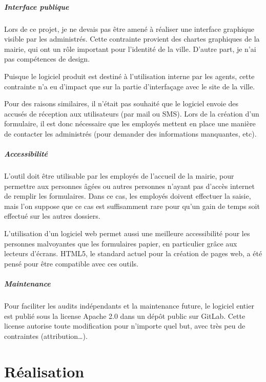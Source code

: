 \documentclass[11pt,french]{memoir}
\begin{document}
	\paragraph{Interface publique}
	Lors de ce projet, je ne devais pas être amené à réaliser une interface graphique visible par les administrés.
	Cette contrainte provient des chartes graphiques de la mairie, qui ont un rôle important pour l'identité de la ville.
	D'autre part, je n'ai pas compétences de design.

	Puisque le logiciel produit est destiné à l'utilisation interne par les agents, cette contrainte n'a eu d'impact que sur la partie d'interfaçage avec le site de la ville.

	Pour des raisons similaires, il n'était pas souhaité que le logiciel envoie des accusés de réception aux utilisateurs (par mail ou SMS).
	Lors de la création d'un formulaire, il est donc nécessaire que les employés mettent en place une manière de contacter les administrés (pour demander des informations manquantes, etc).

	\paragraph{Accessibilité}
	L'outil doit être utilisable par les employés de l'accueil de la mairie, pour permettre aux personnes âgées ou autres personnes n'ayant pas d'accès internet de remplir les formulaires.
	Dans ce cas, les employés doivent effectuer la saisie, mais l'on suppose que ce cas est suffisamment rare pour qu'un gain de temps soit effectué sur les autres dossiers.

	L'utilisation d'un logiciel web permet aussi une meilleure accessibilité pour les personnes malvoyantes que les formulaires papier, en particulier grâce aux lecteurs d'écrans.
	HTML5, le standard actuel pour la création de pages web, a été pensé pour être compatible avec ces outils.

	\paragraph{Maintenance}
	Pour faciliter les audits indépendants et la maintenance future, le logiciel entier est publié sous la license Apache 2.0 dans un dépôt public sur GitLab.
	Cette license autorise toute modification pour n'importe quel but, avec très peu de contraintes (attribution…).


	\chapter{Réalisation}\label{ch:realisation}
\end{document}
